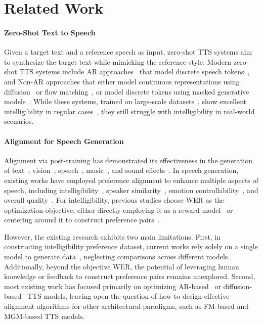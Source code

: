 \documentclass[11pt]{article}
\begin{document}
\section{Related Work}

\paragraph{Zero-Shot Text to Speech}
Given a target text and a reference speech as input, zero-shot TTS systems aim to synthesize the target text while mimicking the reference style. Modern zero-shot TTS systems include AR approaches~\cite{valle, voicecraft, seedtts, fireredtts, cosyvoice, cosyvoice2, vevo} that model discrete speech tokens~\cite{soundstream, encodec}, and Non-AR approaches that either model continuous representations using diffusion~\cite{naturalspeech2} or flow matching~\cite{voicebox, e2tts, f5tts}, or model discrete tokens using masked generative models~\cite{soundstorm, naturalspeech3, maskgct, wang2025metis}. While these systems, trained on large-scale datasets~\cite{emilia, kahn2020libri,emilia-large}, show excellent intelligibility in regular cases~\cite{seedtts,librispeech,cosyvoice2}, they still struggle with intelligibility in real-world scenarios.

\vspace{-1mm}
\paragraph{Alignment for Speech Generation}
Alignment via post-training has demonstrated its effectiveness in the generation of text~\cite{instructgpt,RLHF-anthoropic}, vision~\cite{imagereward,tldr-perturb-vision}, speech~\cite{speechalign,seedtts,cosyvoice2}, music~\cite{musicrl}, and sound effects~\cite{tango2,baton}. In speech generation, existing works have employed preference alignment to enhance multiple aspects of speech, including intelligibility~\cite{seedtts,cosyvoice2,tianjinchuan-pa}, speaker similarity~\cite{seedtts,cosyvoice2,tianjinchuan-pa}, emotion controllability~\cite{seedtts,emo-dpo}, and overall quality~\cite{speechalign,uno,rio,dlpo,fpo,koel-tts}. 
For intelligibility, previous studies choose WER as the optimization objective, either directly employing it as a reward model~\cite{seedtts,cosyvoice2} or centering around it to construct preference pairs~\cite{tianjinchuan-pa,fpo,koel-tts}. 

However, the existing research exhibits two main limitations. First, in constructing intelligibility preference dataset, current works rely solely on a single model to generate data~\cite{tianjinchuan-pa,fpo,koel-tts}, neglecting comparisons across different models. Additionally, beyond the objective WER, the potential of leveraging human knowledge or feedback to construct preference pairs remains unexplored. Second, most existing work has focused primarily on optimizing AR-based~\cite{speechalign,seedtts,cosyvoice2,tianjinchuan-pa} or diffusion-based~\cite{dlpo} TTS models, leaving open the question of how to design effective alignment algorithms for other architectural paradigms, such as FM-based and MGM-based TTS models.
\end{document}
